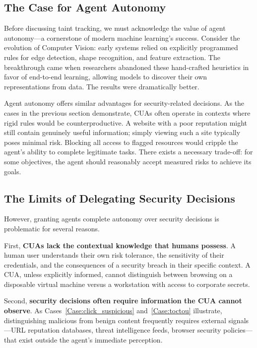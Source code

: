 \subsection{The Case for Agent Autonomy}

Before discussing taint tracking, we must acknowledge the value of agent autonomy---a cornerstone of modern machine learning's success. Consider the evolution of Computer Vision: early systems relied on explicitly programmed rules for edge detection, shape recognition, and feature extraction. The breakthrough came when researchers abandoned these hand-crafted heuristics in favor of end-to-end learning, allowing models to discover their own representations from data. The results were dramatically better.

Agent autonomy offers similar advantages for security-related decisions. As the cases in the previous section demonstrate, CUAs often operate in contexts where rigid rules would be counterproductive. A website with a poor reputation might still contain genuinely useful information; simply viewing such a site typically poses minimal risk. Blocking all access to flagged resources would cripple the agent's ability to complete legitimate tasks. There exists a necessary trade-off: for some objectives, the agent should reasonably accept measured risks to achieve its goals.

\subsection{The Limits of Delegating Security Decisions}

However, granting agents complete autonomy over security decisions is problematic for several reasons.

First, \textbf{CUAs lack the contextual knowledge that humans possess}. A human user understands their own risk tolerance, the sensitivity of their credentials, and the consequences of a security breach in their specific context. A CUA, unless explicitly informed, cannot distinguish between browsing on a disposable virtual machine versus a workstation with access to corporate secrets.

Second, \textbf{security decisions often require information the CUA cannot observe}. As Cases~\ref{Case:click_suspicious} and~\ref{Case:toctou} illustrate, distinguishing malicious from benign content frequently requires external signals---URL reputation databases, threat intelligence feeds, browser security policies---that exist outside the agent's immediate perception.

